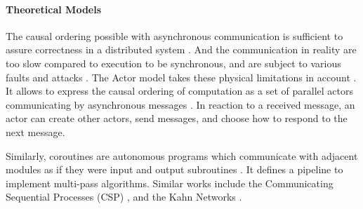 
\paragraph{Theoretical Models}

The causal ordering possible with asynchronous communication is sufficient to assure correctness in a distributed system \cite{Lamport1978,Reed2012}.
And the communication in reality are too slow compared to execution to be synchronous, and are subject to various faults and attacks \cite{Lamport1982}.
The Actor model takes these physical limitations in account \cite{Hewitt1977a}.
It allows to express the causal ordering of computation as a set of parallel actors communicating by asynchronous messages \cite{Hewitt1973a, Hewitt1977, Clinger1981}.
In reaction to a received message, an actor can create other actors, send messages, and choose how to respond to the next message.


Similarly, coroutines are autonomous programs which communicate with adjacent modules as if they were input and output subroutines \cite{Conway1963}.
It defines a pipeline to implement multi-pass algorithms.
Similar works include the Communicating Sequential Processes (CSP) \cite{Hoare1978, Brookes1984}, and the Kahn Networks \cite{Kahn1974, Kahn1976}.


